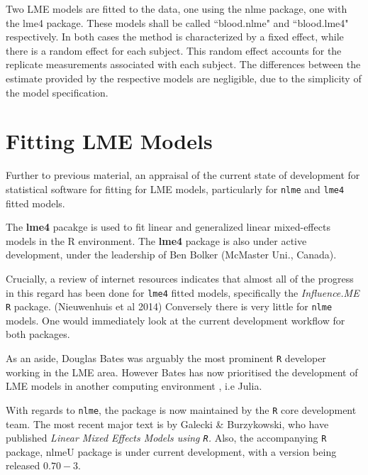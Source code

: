 	
Two LME models are fitted to the data, one using the nlme package, one with the lme4 package. These models shall be called ``blood.nlme" and ``blood.lme4" respectively.
In both cases the method is characterized by a fixed effect, while there is a random effect for each subject.
This random effect accounts for the replicate measurements associated with each subject.
The differences between the estimate provided by the respective models are negligible, due to the simplicity of the model specification.


	
	\chapter{Fitting LME Models}
	Further to previous material, an appraisal of the current state of development for statistical software for fitting for LME models, particularly for \texttt{nlme} and \texttt{lme4} fitted models.
	
	
	The \textbf{lme4} pacakge is used to fit linear and generalized linear mixed-effects models in the R environment.
	The \textbf{lme4} package is also under active development, under the leadership of Ben Bolker (McMaster Uni., Canada).
	
	
	Crucially, a review of internet resources indicates that almost all of the progress in this regard has been done for \texttt{lme4} fitted models, specifically the \textit{Influence.ME} \texttt{R} package. (Nieuwenhuis et al 2014)
	Conversely there is very little for \texttt{nlme} models. One would immediately look at the current development workflow for both packages.
	
	
	As an aside, Douglas Bates was arguably the most prominent \texttt{R} developer working in the LME area. 
	However Bates has now prioritised the development of LME models in another computing environment , i.e Julia. 
	
	
	With regards to \texttt{nlme}, the package is now maintained by the \texttt{R} core development team. The most recent major text is by Galecki \& Burzykowski, who have published \textit{ Linear Mixed Effects Models using \texttt{R}. }
	Also, the accompanying \texttt{R} package, nlmeU package is under current development, with a version being released $0.70-3$.
	
